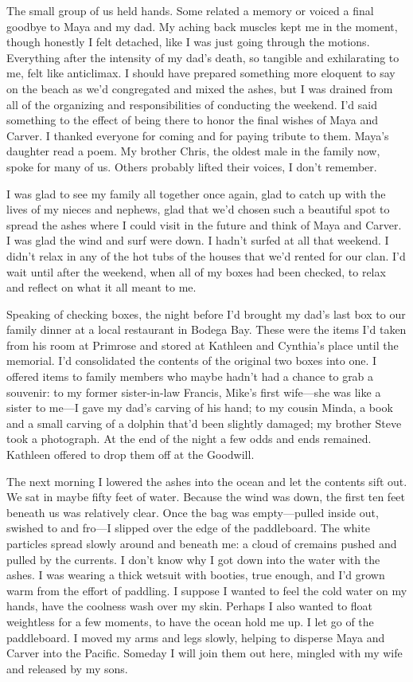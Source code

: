 \documentclass[12pt]{book}
\begin{document}
The small group of us held hands. Some related a memory or voiced a final goodbye to Maya and my dad. My aching back muscles kept me in the moment, though honestly I felt detached, like I was just going through the motions. Everything after the intensity of my dad's death, so tangible and exhilarating to me, felt like anticlimax. I should have prepared something more eloquent to say on the beach as we'd congregated and mixed the ashes, but I was drained from all of the organizing and responsibilities of conducting the weekend. I'd said something to the effect of being there to honor the final wishes of Maya and Carver. I thanked everyone for coming and for paying tribute to them. Maya's daughter read a poem. My brother Chris, the oldest male in the family now, spoke for many of us. Others probably lifted their voices, I don't remember.

I was glad to see my family all together once again, glad to catch up with the lives of my nieces and nephews, glad that we'd chosen such a beautiful spot to spread the ashes where I could visit in the future and think of Maya and Carver. I was glad the wind and surf were down. I hadn't surfed at all that weekend. I didn't relax in any of the hot tubs of the houses that we'd rented for our clan. I'd wait until after the weekend, when all of my boxes had been checked, to relax and reflect on what it all meant to me.

Speaking of checking boxes, the night before I'd brought my dad's last box to our family dinner at a local restaurant in Bodega Bay. These were the items I'd taken from his room at Primrose and stored at Kathleen and Cynthia's place until the memorial. I'd consolidated the contents of the original two boxes into one. I offered items to family members who maybe hadn't had a chance to grab a souvenir: to my former sister-in-law Francis, Mike's first wife---she was like a sister to me---I gave my dad's carving of his hand; to my cousin Minda, a book and a small carving of a dolphin that'd been slightly damaged; my brother Steve took a photograph. At the end of the night a few odds and ends remained. Kathleen offered to drop them off at the Goodwill.

The next morning I lowered the ashes into the ocean and let the contents sift out. We sat in maybe fifty feet of water. Because the wind was down, the first ten feet beneath us was relatively clear. Once the bag was empty---pulled inside out, swished to and fro---I slipped over the edge of the paddleboard. The white particles spread slowly around and beneath me: a cloud of cremains pushed and pulled by the currents. I don't know why I got down into the water with the ashes. I was wearing a thick wetsuit with booties, true enough, and I'd grown warm from the effort of paddling. I suppose I wanted to feel the cold water on my hands, have the coolness wash over my skin. Perhaps I also wanted to float weightless for a few moments, to have the ocean hold me up. I let go of the paddleboard. I moved my arms and legs slowly, helping to disperse Maya and Carver into the Pacific. Someday I will join them out here, mingled with my wife and released by my sons.
\end{document}
